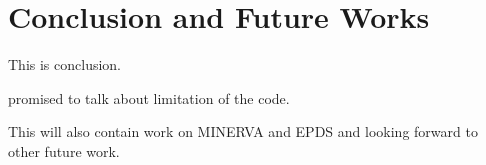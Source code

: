 \chapter{Conclusion and Future Works}\label{chap:conclusion}

This is conclusion.

promised to talk about limitation of the code.

This will also contain work on MINERVA and EPDS and looking forward to
other future work.

